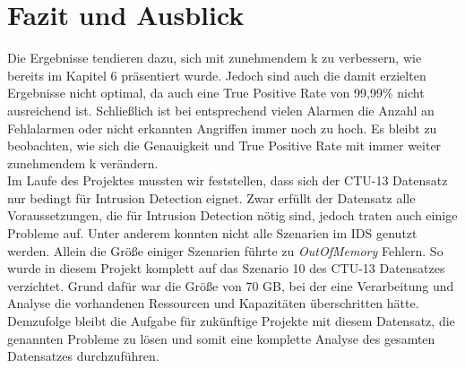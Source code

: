 \documentclass[main.tex]{subfiles}
\author{Philipp Nickel}
\begin{document}
\section{Fazit und Ausblick}



Die Ergebnisse tendieren dazu, sich mit zunehmendem k zu verbessern, wie bereits im Kapitel 6 präsentiert wurde.
Jedoch sind auch die damit erzielten Ergebnisse nicht optimal, da auch eine True Positive Rate von 99,99\% nicht ausreichend ist. Schließlich ist  bei entsprechend vielen Alarmen die Anzahl an Fehlalarmen oder nicht erkannten Angriffen immer noch zu hoch. Es bleibt zu beobachten, wie sich die Genauigkeit und True Positive Rate mit immer weiter zunehmendem k verändern.  
\\
Im Laufe des Projektes mussten wir feststellen, dass sich der CTU-13 Datensatz nur bedingt für Intrusion Detection eignet. Zwar erfüllt der Datensatz alle Voraussetzungen, die für Intrusion Detection nötig sind, jedoch traten auch einige Probleme auf. Unter anderem konnten nicht alle Szenarien im IDS genutzt werden. Allein die Größe einiger Szenarien führte zu \textit{OutOfMemory} Fehlern. So wurde in diesem Projekt komplett auf das Szenario 10 des CTU-13 Datensatzes verzichtet. Grund dafür war die Größe von 70 GB, bei der eine Verarbeitung und Analyse die vorhandenen Ressourcen und Kapazitäten überschritten hätte.
\\
Demzufolge bleibt die Aufgabe für zukünftige Projekte mit diesem Datensatz, die genannten Probleme zu lösen und somit eine komplette Analyse des gesamten Datensatzes durchzuführen.
\end{document}
